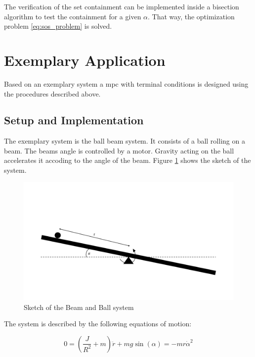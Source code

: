 \documentclass[10pt,a4paper,titlepage]{article}
\begin{document}
The verification of the set containment can be implemented inside a bisection algorithm to test the containment for a given $\alpha$. That way, the optimization problem \eqref{eq:sos_problem}
is solved.









\section{Exemplary Application}
\label{sec:example}

Based on an exemplary system a \gls{mpc} with terminal conditions is designed using the procedures described above. 


\subsection{Setup and Implementation}
The exemplary system is the ball beam system.
It consists of a ball rolling on a beam. The beams angle is controlled by a motor. Gravity acting on the ball accelerates it accoding to the angle of the beam.
Figure \ref{pic:sketch} shows the sketch of the system. 

\begin{figure}[h]
	\begin{center}
		\includegraphics[width=\textwidth]{img/beamBallSketch2.pdf}
		\caption{Sketch of the Beam and Ball system}
		\label{pic:sketch}
	\end{center}
\end{figure}

The system is described by the following equations of motion:

\begin{equation}
    0 = \left(\frac{J}{R^2} + m\right)\ddot{r} + mg\sin(\alpha) = - mr\dot{\alpha}^2
\end{equation}
\end{document}
